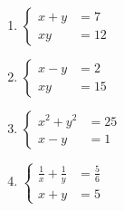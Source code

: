 \documentclass[11pt,a4paper]{scrartcl}
\begin{document}
\begin{enumerate}
    \item $\left\{\begin{aligned} x+y&=7 \\ xy&=12 \end{aligned}\right.$
    \item $\left\{\begin{aligned} x-y&=2 \\ xy&=15 \end{aligned}\right.$
    \item $\left\{\begin{aligned} x^2+y^2&=25 \\ x-y&=1 \end{aligned}\right.$
    \item $\left\{\begin{aligned} \frac{1}{x} + \frac{1}{y} &= \frac{5}{6} \\ x+y&=5 \end{aligned}\right.$


\end{enumerate}
\end{document}
